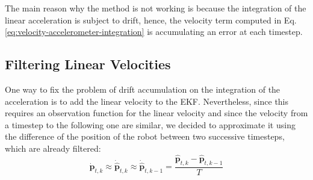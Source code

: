 \documentclass[a4paper]{article}
\begin{document}
The main reason why the method is not working is because the integration of the
linear acceleration is subject to drift, hence, the velocity term computed in
Eq. \ref{eq:velocity-accelerometer-integration} is accumulating an error
at each timestep.

\subsection{Filtering Linear Velocities}
One way to fix the problem of drift accumulation on the
integration of the acceleration is to add the linear velocity to the EKF. Nevertheless, since this
requires an observation function for the linear velocity and since
the velocity from a timestep to the following one are similar, we decided to
approximate it using the difference of the position of the robot between
two successive timesteps, which are already filtered:
\begin{equation}
    \bm{\dot{p}}_{t,k} \approx \bm{\dot{\hat{p}}}_{t,k} \approx \bm{\dot{\hat{p}}}_{t,k-1}
    = \frac{\bm{\hat{p}}_{t,k} - \bm{\hat{p}}_{t,k-1}}{T}
\end{equation}
\end{document}
